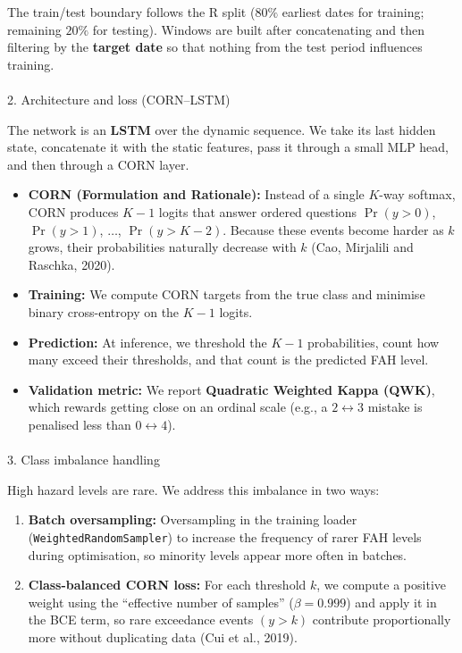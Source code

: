 \documentclass[
  letterpaper,
  DIV=11,
  numbers=noendperiod]{scrartcl}
\makeatletter
\let\oldparagraph\paragraph
\renewcommand{\paragraph}{
    \@ifstar
      \xxxParagraphStar
      \xxxParagraphNoStar
  }
\newcommand{\xxxParagraphStar}[1]{\oldparagraph*{#1}\mbox{}}
\newcommand{\xxxParagraphNoStar}[1]{\oldparagraph{#1}\mbox{}}
\providecommand{\tightlist}{%
  \setlength{\itemsep}{0pt}\setlength{\parskip}{0pt}}\usepackage{longtable,booktabs,array}
\makeatother
\begin{document}
The train/test boundary follows the R split (\(80\%\) earliest dates for
training; remaining \(20\%\) for testing). Windows are built after
concatenating and then filtering by the \textbf{target date} so that
nothing from the test period influences training.

\paragraph{2. Architecture and loss
(CORN--LSTM)}\label{architecture-and-loss-cornlstm}

The network is an \textbf{LSTM} over the dynamic sequence. We take its
last hidden state, concatenate it with the static features, pass it
through a small MLP head, and then through a CORN layer.

\begin{itemize}
\tightlist
\item
  \textbf{CORN (Formulation and Rationale):} Instead of a single
  \(K\)-way softmax, CORN produces \(K - 1\) logits that answer ordered
  questions \(\Pr(y > 0)\), \(\Pr(y > 1)\), \(\ldots\),
  \(\Pr(y > K - 2)\). Because these events become harder as \(k\) grows,
  their probabilities naturally decrease with \(k\) (Cao, Mirjalili and
  Raschka, 2020).
\item
  \textbf{Training:} We compute CORN targets from the true class and
  minimise binary cross-entropy on the \(K - 1\) logits.
\item
  \textbf{Prediction:} At inference, we threshold the \(K - 1\)
  probabilities, count how many exceed their thresholds, and that count
  is the predicted FAH level.
\item
  \textbf{Validation metric:} We report \textbf{Quadratic Weighted Kappa
  (QWK)}, which rewards getting close on an ordinal scale (e.g., a
  \(2 \leftrightarrow 3\) mistake is penalised less than
  \(0 \leftrightarrow 4\)).
\end{itemize}

\paragraph{3. Class imbalance handling}\label{class-imbalance-handling}

High hazard levels are rare. We address this imbalance in two ways:

\begin{enumerate}
\def\labelenumi{\arabic{enumi}.}
\tightlist
\item
  \textbf{Batch oversampling:} Oversampling in the training loader
  (\texttt{WeightedRandomSampler}) to increase the frequency of rarer
  FAH levels during optimisation, so minority levels appear more often
  in batches.\\
\item
  \textbf{Class-balanced CORN loss:} For each threshold \(k\), we
  compute a positive weight using the ``effective number of samples''
  (\(\beta = 0.999\)) and apply it in the BCE term, so rare exceedance
  events \((y > k)\) contribute proportionally more without duplicating
  data (Cui et al., 2019).
\end{enumerate}
\end{document}

